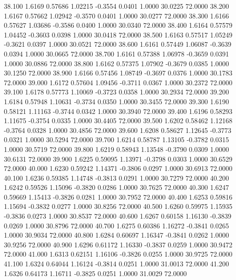   38.100   1.6169   0.57686   1.02215  -0.3554   0.0401   1.0000  30.0225  72.0000
  38.200   1.6167   0.57662   1.02942  -0.3570   0.0401   1.0000  30.0277  72.0000
  38.300   1.6166   0.57627   1.03686  -0.3586   0.0400   1.0000  30.0340  72.0000
  38.400   1.6164   0.57579   1.04452  -0.3603   0.0398   1.0000  30.0418  72.0000
  38.500   1.6163   0.57517   1.05249  -0.3621   0.0397   1.0000  30.0521  72.0000
  38.600   1.6161   0.57449   1.06087  -0.3639   0.0394   1.0000  30.0665  72.0000
  38.700   1.6161   0.57388   1.06978  -0.3659   0.0391   1.0000  30.0886  72.0000
  38.800   1.6162   0.57375   1.07902  -0.3679   0.0385   1.0000  30.1250  72.0000
  38.900   1.6166   0.57456   1.08749  -0.3697   0.0376   1.0000  30.1783  72.0000
  39.000   1.6172   0.57604   1.09456  -0.3711   0.0367   1.0000  30.2372  72.0000
  39.100   1.6178   0.57773   1.10069  -0.3723   0.0358   1.0000  30.2934  72.0000
  39.200   1.6184   0.57948   1.10631  -0.3734   0.0350   1.0000  30.3455  72.0000
  39.300   1.6190   0.58121   1.11163  -0.3744   0.0342   1.0000  30.3940  72.0000
  39.400   1.6196   0.58293   1.11675  -0.3754   0.0335   1.0000  30.4405  72.0000
  39.500   1.6202   0.58462   1.12168  -0.3764   0.0328   1.0000  30.4856  72.0000
  39.600   1.6208   0.58627   1.12645  -0.3773   0.0321   1.0000  30.5294  72.0000
  39.700   1.6214   0.58787   1.13105  -0.3782   0.0315   1.0000  30.5719  72.0000
  39.800   1.6219   0.58943   1.13548  -0.3790   0.0309   1.0000  30.6131  72.0000
  39.900   1.6225   0.59095   1.13971  -0.3798   0.0303   1.0000  30.6529  72.0000
  40.000   1.6230   0.59242   1.14371  -0.3806   0.0297   1.0000  30.6913  72.0000
  40.100   1.6236   0.59385   1.14748  -0.3813   0.0291   1.0000  30.7279  72.0000
  40.200   1.6242   0.59526   1.15096  -0.3820   0.0286   1.0000  30.7625  72.0000
  40.300   1.6247   0.59669   1.15413  -0.3826   0.0281   1.0000  30.7952  72.0000
  40.400   1.6253   0.59816   1.15694  -0.3832   0.0277   1.0000  30.8256  72.0000
  40.500   1.6260   0.59975   1.15935  -0.3836   0.0273   1.0000  30.8537  72.0000
  40.600   1.6267   0.60158   1.16130  -0.3839   0.0269   1.0000  30.8796  72.0000
  40.700   1.6275   0.60386   1.16272  -0.3841   0.0265   1.0000  30.9034  72.0000
  40.800   1.6284   0.60697   1.16347  -0.3841   0.0262   1.0000  30.9256  72.0000
  40.900   1.6296   0.61172   1.16330  -0.3837   0.0259   1.0000  30.9472  72.0000
  41.000   1.6313   0.62151   1.16106  -0.3826   0.0255   1.0000  30.9725  72.0000
  41.100   1.6324   0.64044   1.16124  -0.3814   0.0251   1.0000  31.0013  72.0000
  41.200   1.6326   0.64173   1.16711  -0.3825   0.0251   1.0000  31.0029  72.0000
